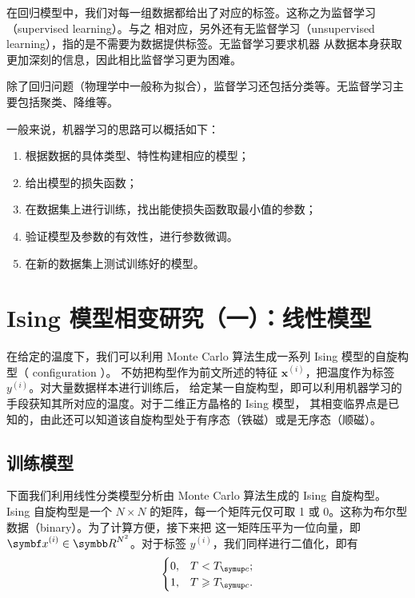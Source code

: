 在回归模型中，我们对每一组数据都给出了对应的标签。这称之为监督学习（supervised learning）。与之
相对应，另外还有无监督学习（unsupervised learning），指的是不需要为数据提供标签。无监督学习要求机器
从数据本身获取更加深刻的信息，因此相比监督学习更为困难。

除了回归问题（物理学中一般称为拟合），监督学习还包括分类等。无监督学习主要包括聚类、降维等。

一般来说，机器学习的思路可以概括如下：

\begin{enumerate}
  \item 根据数据的具体类型、特性构建相应的模型；
  \item 给出模型的损失函数；
  \item 在数据集上进行训练，找出能使损失函数取最小值的参数；
  \item 验证模型及参数的有效性，进行参数微调。
  \item 在新的数据集上测试训练好的模型。
\end{enumerate}

\section{Ising 模型相变研究（一）：线性模型}

在给定的温度下，我们可以利用 Monte Carlo 算法生成一系列 Ising 模型的自旋构型（ configuration ）。
不妨把构型作为前文所述的特征 $\bm{x}^{(i)}$，把温度作为标签 $y^{(i)}$。对大量数据样本进行训练后，
给定某一自旋构型，即可以利用机器学习的手段获知其所对应的温度。对于二维正方晶格的 Ising 模型，
其相变临界点是已知的，由此还可以知道该自旋构型处于有序态（铁磁）或是无序态（顺磁）。

\subsection{训练模型}

下面我们利用线性分类模型分析由 Monte Carlo 算法生成的 Ising 自旋构型。Ising 自旋构型是一个
$N\times N$ 的矩阵，每一个矩阵元仅可取 1 或 0。这称为布尔型数据（binary）。为了计算方便，接下来把
这一矩阵压平为一位向量，即 $\bm{x}^{(i)}\in\R^{N^2}$。对于标签 $y^{(i)}$，我们同样进行二值化，即有
\begin{equation}
  \begin{cases}
    0, & T <         \Tc; \\
    1, & T \geqslant \Tc.
  \end{cases}
\end{equation}

